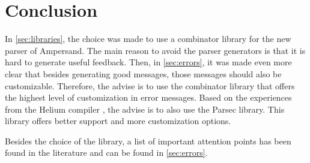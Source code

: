 
\section{Conclusion}
\label{sec:conclusion}
In \autoref{sec:libraries}, the choice was made to use a combinator library for the new parser of Ampersand.
The main reason to avoid the parser generators is that it is hard to generate useful feedback.
Then, in \autoref{sec:errors}, it was made even more clear that besides generating good messages, those messages should also be customizable.
Therefore, the advise is to use the combinator library that offers the highest level of customization in error messages.
Based on the experiences from the Helium compiler \cite{helium-parser}, the advise is to also use the Parsec library.
This library offers better support and more customization options.

Besides the choice of the library, a list of important attention points has been found in the literature and can be found in \autoref{sec:errors}.